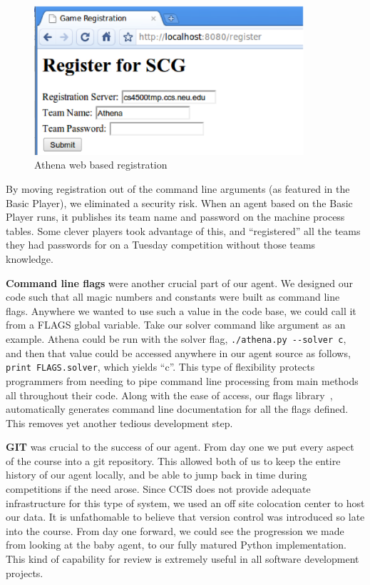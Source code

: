 \documentclass[letterpaper,12pt,oneside]{article}
\begin{document}
\begin{figure}[htp]
\centering
\includegraphics[width=100mm]{registration.eps}
\caption{Athena web based registration}
\label{fig:registration}
\end{figure}

By moving registration out of the command line arguments (as featured in the 
Basic Player), we eliminated a security risk. When an agent based on the Basic
Player runs, it publishes its team name and password on the machine process
tables. Some clever players took advantage of this, and ``registered'' all the
teams they had passwords for on a Tuesday competition without those teams
knowledge.

\textbf{Command line flags} were another crucial part of our agent. We designed
our code such that all magic numbers and constants were built as command line
flags. Anywhere we wanted to use such a value in the code base, we could call it
from a FLAGS global variable. Take our solver command like argument as an
example. Athena could be run with the solver flag,
\verb=./athena.py --solver c=, and then that value could be accessed anywhere
in our agent source as follows, \verb=print FLAGS.solver=, which yields ``c''.
This type of flexibility protects programmers from needing to pipe command line
processing from main methods all throughout their code. Along with the ease of
access, our flags library~\cite{gflags:website}, automatically generates
command line documentation for all the flags defined. This removes yet another
tedious development step.

\textbf{GIT} was crucial to the success of our agent. From day one we put every
aspect of the course into a git repository. This allowed both of us to keep the
entire history of our agent locally, and be able to jump back in time during
competitions if the need arose. Since CCIS does not provide adequate
infrastructure for this type of system, we used an off site colocation center to
host our data. It is unfathomable to believe that version control was introduced
so late into the course. From day one forward, we could see the progression we
made from looking at the baby agent, to our fully matured Python implementation.
This kind of capability for review is extremely useful in all software
development projects.
\end{document}
